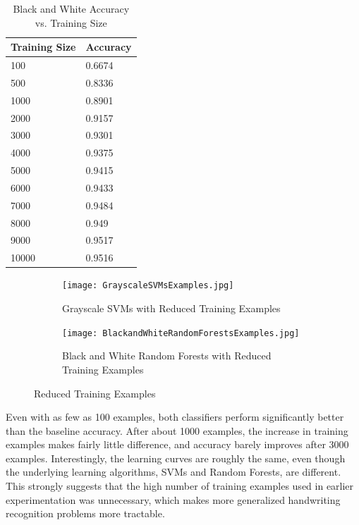 \documentclass[12pt]{article}
\begin{document}
\begin{table}[H]
\centering
\caption{Black and White Accuracy vs. Training Size}
    \begin{tabular}{|l|l|}
    \hline
    Training Size & Accuracy \\ \hline
    100      & 0.6674   \\ \hline
    500      & 0.8336   \\ \hline
    1000      & 0.8901   \\ \hline
    2000      & 0.9157   \\ \hline
    3000      & 0.9301   \\ \hline
    4000      & 0.9375   \\ \hline
    5000      & 0.9415   \\ \hline
    6000      & 0.9433   \\ \hline
    7000      & 0.9484   \\ \hline
    8000      & 0.949   \\ \hline
    9000      & 0.9517   \\ \hline
    10000      & 0.9516   \\ \hline
    \end{tabular}
\end{table}

\begin{figure}[H]
\centering
\begin{subfigure}{.45\textwidth}
  \centering
  \texttt{[image: GrayscaleSVMsExamples.jpg]}
  \caption{Grayscale SVMs with Reduced Training Examples}
  \label{fig:sub1}
\end{subfigure}%
\hspace{2mm}
\begin{subfigure}{.45\textwidth}
  \centering
  \texttt{[image: BlackandWhiteRandomForestsExamples.jpg]}
  \caption{Black and White Random Forests with Reduced Training Examples}
  \label{fig:sub2}
\end{subfigure}
\caption{Reduced Training Examples}
\label{fig:test}
\end{figure}

Even with as few as 100 examples, both classifiers perform significantly better than the baseline accuracy. After about 1000 examples, the increase in training examples makes fairly little difference, and accuracy barely improves after 3000 examples. Interestingly, the learning curves are roughly the same, even though the underlying learning algorithms, SVMs and Random Forests, are different. This strongly suggests that the high number of training examples used in earlier experimentation was unnecessary, which makes more generalized handwriting recognition problems more tractable. 
\end{document}
